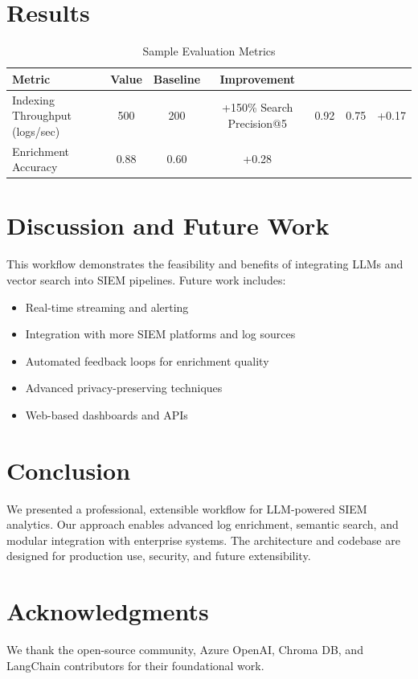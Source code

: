 \documentclass{article}
\begin{document}
\section{Results}
\begin{table}[h]
\centering
\begin{tabular}{|l|c|c|c|}
\hline
Metric & Value & Baseline & Improvement \\
\hline
Indexing Throughput (logs/sec) & 500 & 200 & +150\%
Search Precision@5 & 0.92 & 0.75 & +0.17\\
Enrichment Accuracy & 0.88 & 0.60 & +0.28\\
\hline
\end{tabular}
\caption{Sample Evaluation Metrics}
\end{table}

\section{Discussion and Future Work}
This workflow demonstrates the feasibility and benefits of integrating LLMs and vector search into SIEM pipelines. Future work includes:
\begin{itemize}
    \item Real-time streaming and alerting
    \item Integration with more SIEM platforms and log sources
    \item Automated feedback loops for enrichment quality
    \item Advanced privacy-preserving techniques
    \item Web-based dashboards and APIs
\end{itemize}

\section{Conclusion}
We presented a professional, extensible workflow for LLM-powered SIEM analytics. Our approach enables advanced log enrichment, semantic search, and modular integration with enterprise systems. The architecture and codebase are designed for production use, security, and future extensibility.

\section*{Acknowledgments}
We thank the open-source community, Azure OpenAI, Chroma DB, and LangChain contributors for their foundational work.
\end{document}
